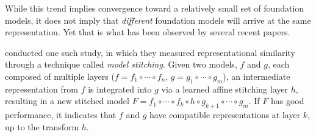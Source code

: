 \documentclass{article}
\theoremstyle{plain}
\theoremstyle{definition}
\theoremstyle{remark}
\begin{document}



While this trend implies convergence toward a relatively small set of foundation models, it does not imply that \textit{different} foundation models will arrive at the same representation. Yet that is what has been observed by several recent papers. 

\citet{lenc2015understanding} conducted one such study, in which they measured representational similarity through a technique called \textit{model stitching}. Given two models, $f$ and $g$, each composed of multiple layers ($ f = f_1 \circ \cdots \circ f_n $, $ g = g_1 \circ \cdots \circ g_m $), an intermediate representation from $f$ is integrated into $g$ via a learned affine stitching layer $ h $, resulting in a new stitched model $F = f_1 \circ \cdots \circ f_k \circ h \circ g_{k+1} \circ \cdots \circ g_m $. %
If $F$ has good performance, it indicates that $f$ and $g$ have compatible representations at layer $k$, up to the  transform $h$.
\end{document}

